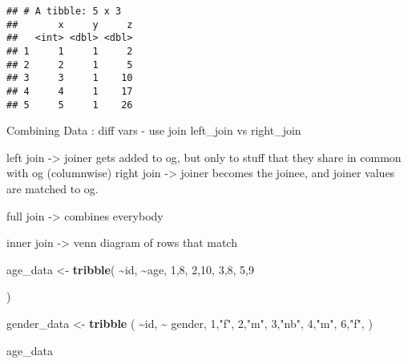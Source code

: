 \documentclass[
]{article}
\newenvironment{Shaded}{\begin{snugshade}}{\end{snugshade}}
\newcommand{\DecValTok}[1]{\textcolor[rgb]{0.00,0.00,0.81}{#1}}
\newcommand{\FunctionTok}[1]{\textcolor[rgb]{0.13,0.29,0.53}{\textbf{#1}}}
\newcommand{\NormalTok}[1]{#1}
\newcommand{\OtherTok}[1]{\textcolor[rgb]{0.56,0.35,0.01}{#1}}
\newcommand{\SpecialCharTok}[1]{\textcolor[rgb]{0.81,0.36,0.00}{\textbf{#1}}}
\newcommand{\StringTok}[1]{\textcolor[rgb]{0.31,0.60,0.02}{#1}}
\begin{document}
\begin{verbatim}
## # A tibble: 5 x 3
##       x     y     z
##   <int> <dbl> <dbl>
## 1     1     1     2
## 2     2     1     5
## 3     3     1    10
## 4     4     1    17
## 5     5     1    26
\end{verbatim}

Combining Data : diff vars - use join left\_join vs right\_join

left join -\textgreater{} joiner gets added to og, but only to stuff
that they share in common with og (columnwise) right join
-\textgreater{} joiner becomes the joinee, and joiner values are matched
to og.

full join -\textgreater{} combines everybody

inner join -\textgreater{} venn diagram of rows that match

\begin{Shaded}
\begin{Highlighting}[]
\NormalTok{age\_data }\OtherTok{\textless{}{-}} \FunctionTok{tribble}\NormalTok{(}
                     \SpecialCharTok{\textasciitilde{}}\NormalTok{id, }\SpecialCharTok{\textasciitilde{}}\NormalTok{age,}
                     \DecValTok{1}\NormalTok{,}\DecValTok{8}\NormalTok{,}
                     \DecValTok{2}\NormalTok{,}\DecValTok{10}\NormalTok{,}
                     \DecValTok{3}\NormalTok{,}\DecValTok{8}\NormalTok{,}
                     \DecValTok{5}\NormalTok{,}\DecValTok{9}
                     
\NormalTok{              )}

\NormalTok{gender\_data }\OtherTok{\textless{}{-}} \FunctionTok{tribble}\NormalTok{ (}
                        \SpecialCharTok{\textasciitilde{}}\NormalTok{id, }\SpecialCharTok{\textasciitilde{}}\NormalTok{ gender,}
                        \DecValTok{1}\NormalTok{,}\StringTok{"f"}\NormalTok{,}
                        \DecValTok{2}\NormalTok{,}\StringTok{"m"}\NormalTok{,}
                        \DecValTok{3}\NormalTok{,}\StringTok{"nb"}\NormalTok{,}
                        \DecValTok{4}\NormalTok{,}\StringTok{"m"}\NormalTok{,}
                        \DecValTok{6}\NormalTok{,}\StringTok{"f"}\NormalTok{,}
\NormalTok{              )}
\end{Highlighting}
\end{Shaded}

\begin{Shaded}
\begin{Highlighting}[]
\NormalTok{age\_data}
\end{Highlighting}
\end{Shaded}
\end{document}
